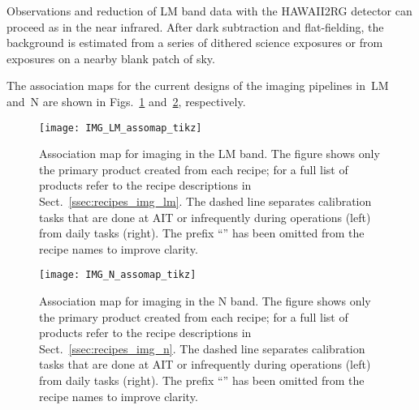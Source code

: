 Observations and reduction of LM band data with the HAWAII2RG detector
can proceed as in the near infrared. After dark subtraction and
flat-fielding, the background is estimated from a series of dithered
science exposures or from exposures on a nearby blank patch of sky.

The association maps for the current designs of the imaging pipelines
in~LM and~N are shown in Figs.~\ref{fig:IMG_LM_Assomap}
and~\ref{fig:IMG_N_Assomap}, respectively.


\begin{landscape}
  \begin{figure}
    \centering
    \texttt{[image: IMG\_LM\_assomap\_tikz]}
    \caption[Reduction cascade and association map for imaging in L and
      M]{Association map for imaging in the LM band. The figure shows only
      the primary product created from each recipe; for a full list of
      products refer to the recipe descriptions in
      Sect.~\ref{ssec:recipes_img_lm}. The dashed line separates
      calibration tasks that are done at AIT or infrequently during
      operations (left) from daily tasks (right). The prefix ``'' has been
      omitted from the recipe names to improve clarity.}
    \label{fig:IMG_LM_Assomap}
  \end{figure}
\end{landscape}

\begin{landscape}
\begin{figure}
  \centering
    \texttt{[image: IMG\_N\_assomap\_tikz]}
    \caption[Reduction cascade and association map for imaging in N]{%
      Association map for imaging in the N band. The figure shows
      only the primary product created from each recipe; for a full
      list of products refer to the recipe descriptions in
      Sect.~\ref{ssec:recipes_img_n}. The dashed line separates
      calibration tasks that are done at AIT or infrequently during
      operations (left) from daily tasks (right). The prefix ``'' has
      been omitted from the recipe names to improve clarity.}
    \label{fig:IMG_N_Assomap}
  \end{figure}
\end{landscape}

